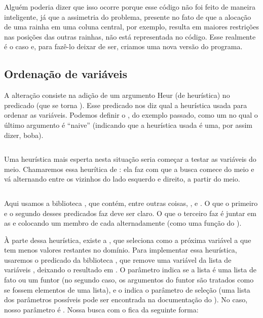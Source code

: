 \documentclass{article}
\begin{document}
Alguém poderia dizer que isso ocorre porque esse código não foi feito de maneira inteligente,
já que a assimetria do problema, presente no fato de que a alocação de uma rainha em uma coluna
central, por exemplo, resulta em maiores restrições nas posições das outras rainhas, não está
representada no código. Esse realmente é o caso e, para fazê-lo deixar de ser, criamos uma nova
versão do programa.

\subsection{Ordenação de variáveis}

A alteração consiste na adição de um argumento Heur (de heurística) no predicado  (que se torna
). Esse predicado nos diz qual a heurística usada para ordenar as variáveis.
Podemos definir o , do exemplo passado, como um  no qual o
último argumento é ``naive'' (indicando que a heurística usada é uma, por assim dizer, boba).

    \inputminted{prolog}{../Exemplos/Cap11/prog2_queensHeurNaive.ecl}

Uma heurística mais esperta nesta situação seria começar a testar as variáveis do meio. Chamaremos
essa heurítica de : ela faz com que a busca comece do meio e vá alternando
entre os vizinhos do lado esquerdo e direito, a partir do meio.

    \inputminted{prolog}{../Exemplos/Cap11/prog3_queensHeurMout.ecl}

Aqui usamos a biblioteca , que contém, entre outras coisas, ,
 e . O que o primeiro e o segundo desses predicados faz deve ser
claro. O que o terceiro faz é juntar em  as  e
 colocando um membro de cada alternadamente (como uma função
 do ).

À parte dessa heurística, existe a , que seleciona como a próxima variável a
que tem menos valores restantes no domínio. Para implementar essa heurística, usaremos o predicado
da biblioteca  , que remove uma variável
 da lista de variáveis , deixando o resultado em . O parâmetro 
indica se a lista é uma lista de fato ou um funtor (no segundo caso, os argumentos do funtor são
tratados como se fossem elementos de uma lista), e o  indica o parâmetro de seleção (uma
lista dos parâmetros possíveis pode ser encontrada na documentação do \eclipse). No caso, nosso
parâmetro é . Nossa busca com o  fica da seguinte
forma:
\end{document}

